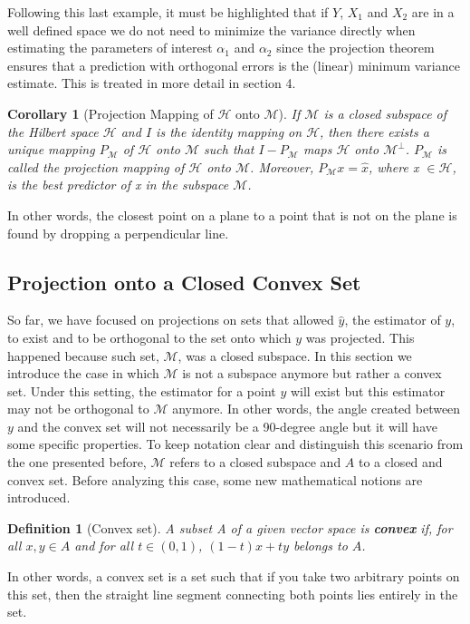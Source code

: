 \documentclass{article}
\newtheorem{defn}{Definition}
\newtheorem{cor}{Corollary}
\begin{document}
Following this last example, it must be highlighted that if $Y$, $X_1$ and $X_2$ are in a well defined space we do not need to minimize the variance directly when estimating the parameters of interest $\alpha_1$ and $\alpha_2$ since the projection theorem ensures that a prediction with orthogonal errors is the (linear) minimum variance estimate. This is treated in more detail in section 4.\newline

\begin{cor}[Projection Mapping of $\mathscr{H}$ onto $\mathscr{M}$]
If $\mathscr{M}$ is a closed subspace of the Hilbert space $\mathscr{H}$ and $I$ is the identity mapping on $\mathscr{H}$, then there exists a unique mapping $P_\mathscr{M}$ of $\mathscr{H}$ onto $\mathscr{M}$ such that $I - P_\mathscr{M}$ maps $\mathscr{H}$ onto $\mathscr{M^\bot}$. $P_\mathscr{M}$ is called the projection mapping of $\mathscr{H}$ onto $\mathscr{M}$. Moreover, $P_\mathscr{M} x = \hat{x}$, where x $\in \mathscr{H}$, is the best predictor of x in the subspace $\mathscr{M}$. 
\end{cor}

In other words, the closest point on a plane to a point that is not on the plane is found by dropping a perpendicular line. \newline

\subsection{Projection onto a Closed Convex Set}

So far, we have focused on projections on sets that allowed $\hat{y}$, the estimator of $y$, to exist and to be orthogonal to the set onto which $y$ was projected. This happened because such set, $\mathscr{M}$, was a closed subspace. In this section we introduce the case in which $\mathscr{M}$ is not a subspace anymore but rather a convex set. Under this setting, the estimator for a point $y$ will exist but this estimator may not be orthogonal to $\mathscr{M}$ anymore. In other words, the angle created between $y$ and the convex set will not necessarily be a 90-degree angle but it will have some specific properties.  To keep notation clear and distinguish this scenario from the one presented before, $\mathscr{M}$ refers to a closed subspace and $A$ to a closed and convex set. Before analyzing this case, some new mathematical notions are introduced. \newline

\begin{defn}[Convex set]
A subset A of a given vector space is \textbf{convex} if, for all $x, y \in A$ and for all $t \in (0,1)$, $(1-t)x + ty$ belongs to $A$. 
\end{defn}
In other words, a convex set is a set such that if you take two arbitrary points on this set, then the straight line segment connecting both points lies entirely in the set. \newline
\end{document}
